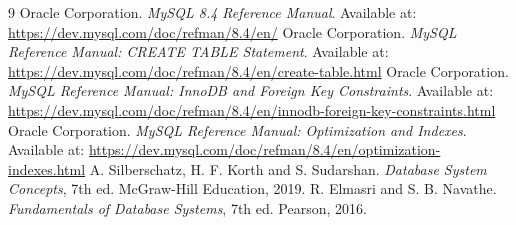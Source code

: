 \documentclass[10pt,a4paper]{report}
\begin{document}
\renewcommand{\bibname}{References}
\begin{thebibliography}{9}
 Oracle Corporation. \textit{MySQL 8.4 Reference Manual}. Available at: \url{https://dev.mysql.com/doc/refman/8.4/en/}
 Oracle Corporation. \textit{MySQL Reference Manual: CREATE TABLE Statement}. Available at: \url{https://dev.mysql.com/doc/refman/8.4/en/create-table.html}
 Oracle Corporation. \textit{MySQL Reference Manual: InnoDB and Foreign Key Constraints}. Available at: \url{https://dev.mysql.com/doc/refman/8.4/en/innodb-foreign-key-constraints.html}
 Oracle Corporation. \textit{MySQL Reference Manual: Optimization and Indexes}. Available at: \url{https://dev.mysql.com/doc/refman/8.4/en/optimization-indexes.html}
 A. Silberschatz, H. F. Korth and S. Sudarshan. \textit{Database System Concepts}, 7th ed. McGraw-Hill Education, 2019.
 R. Elmasri and S. B. Navathe. \textit{Fundamentals of Database Systems}, 7th ed. Pearson, 2016.
\end{thebibliography}
\end{document}
